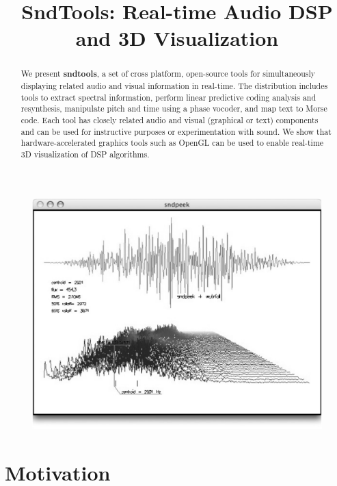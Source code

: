\documentclass{article}
\title{SndTools: Real-time Audio DSP and 3D Visualization}
\begin{document}
%
\maketitle
%

\begin{figure}[t!]
\center
\includegraphics[width=\columnwidth]{sndpeek3_bw}
\end{figure}

\begin{abstract}
We present {\bf sndtools}, a set of cross platform, open-source tools for simultaneously displaying related audio and visual information in real-time. The distribution includes tools to extract spectral information, perform linear predictive coding analysis and resynthesis, manipulate pitch and time using a phase vocoder, and map text to Morse code. Each tool has closely related audio and visual (graphical or text) components and can be used for instructive purposes or experimentation with sound. We show that hardware-accelerated graphics tools such as OpenGL can be used to enable real-time 3D visualization of DSP algorithms. 
\end{abstract}
%
\section{Motivation}
\end{document}
